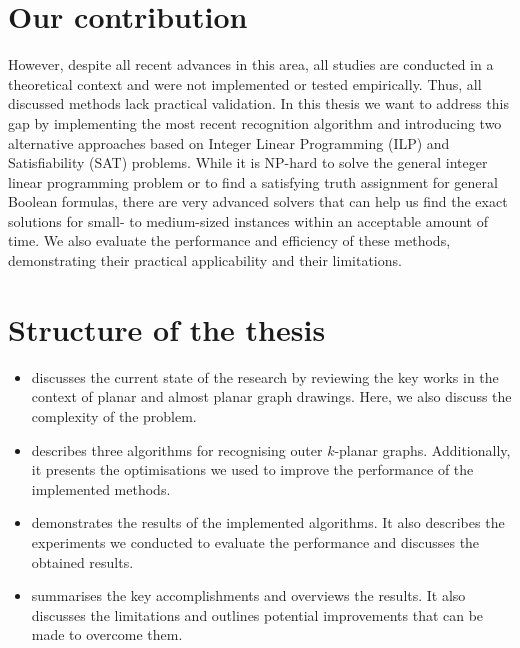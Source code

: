 \section{Our contribution}

However, despite all recent advances in this area, all studies are conducted in a theoretical context and were not implemented or tested empirically. Thus, all discussed methods lack practical validation. In this thesis we want to address this gap by implementing the most recent recognition algorithm and introducing two alternative approaches based on Integer Linear Programming (ILP) and Satisfiability (SAT) problems. While it is NP-hard to solve the general integer linear programming problem or to find a satisfying truth assignment for general Boolean formulas, there are very advanced solvers that can help us find the exact solutions for small- to medium-sized instances within an acceptable amount of time. We also evaluate the performance and efficiency of these methods, demonstrating their practical applicability and their limitations.


\section{Structure of the thesis}

\begin{itemize}
    \item {} discusses the current state of the research by reviewing the key works in the context of planar and almost planar graph drawings. Here, we also discuss the complexity of the problem.
    \item {} describes three algorithms for recognising outer \(k\)-planar graphs. Additionally, it presents the optimisations we used to improve the performance of the implemented methods.
    \item {} demonstrates the results of the implemented algorithms. It also describes the experiments we conducted to evaluate the performance and discusses the obtained results.
    \item {} summarises the key accomplishments and overviews the results. It also discusses the limitations and outlines potential improvements that can be made to overcome them.
\end{itemize}